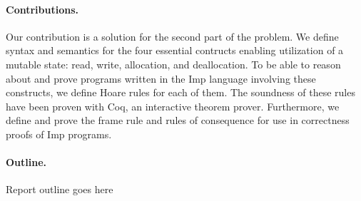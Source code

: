 
\paragraph{Contributions.}
Our contribution is a solution for the second part of the problem. We define syntax and semantics for the four essential contructs enabling utilization of a mutable state: read, write, allocation, and deallocation. To be able to reason about and prove programs written in the Imp language involving these constructs, we define Hoare rules for each of them. The soundness of these rules have been proven with Coq, an interactive theorem prover. Furthermore, we define and prove the frame rule and rules of consequence for use in correctness proofs of Imp programs.

\paragraph{Outline.}
Report outline goes here